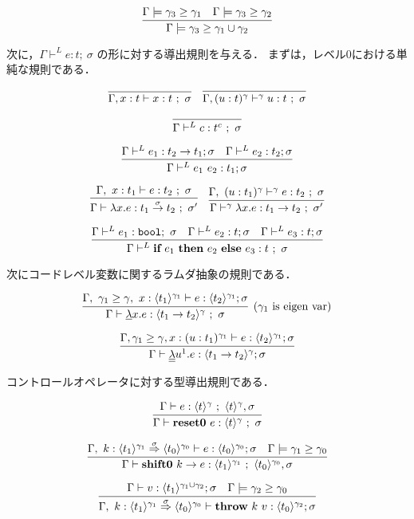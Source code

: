 \documentclass[T]{compsoft}
\newcommand\fun[2]{\lambda{#1}.{#2}}
\newcommand\Resetz{\textbf{reset0}}
\newcommand\Shiftz{\textbf{shift0}}
\newcommand\Throw{\textbf{throw}}
\newcommand\resetz[1]{\Resetz~{#1}}
\newcommand\shiftz[2]{\Shiftz~{#1}\to{#2}}
\newcommand\throw[2]{\Throw~{#1}~{#2}}
\newcommand\cfun[2]{\underline{\lambda}{#1}.{#2}}
\newcommand\ccfun[2]{\underline{\underline{\lambda}}{#1}.{#2}}
\newcommand\boolT{\mbox{\texttt{bool}}}
\newcommand\codeT[2]{\langle{#1}\rangle^{#2}}
\newcommand\funT[3]{{#1} \stackrel{#3}{\rightarrow} {#2}}
\newcommand\contT[3]{{#1} \stackrel{#3}{\Rightarrow} {#2}}
\newcommand\ord{\ge}
\newcommand\ift[3]{\textbf{if}~{#1}~\textbf{then}~{#2}~\textbf{else}~{#3}}
\theoremstyle{break}
\begin{document}
\[
  \infer
  {\Gamma \models \gamma_3 \ord \gamma_1 \cup \gamma_2}
  {\Gamma \models \gamma_3 \ord \gamma_1
    &\Gamma \models \gamma_3 \ord \gamma_2}
\]



次に，$\Gamma \vdash^{L} e : t ;~\sigma$ の形に対する導出規則を与える．
まずは，レベル0における単純な規則である．

\[
  \infer
  {\Gamma, x : t \vdash x : t ~;~ \sigma}
  {}
  \quad
  \infer
  {\Gamma, (u : t)^\gamma \vdash^\gamma u : t ~;~ \sigma}
  {}
\]

\[
  \infer
  {\Gamma \vdash^{L} c : t^c ~;~\sigma}
  {}
\]

\[
  \infer
  {\Gamma \vdash^{L} e_1~ e_2 : t_1 ; \sigma}
  {\Gamma \vdash^{L} e_1 : t_2 \to t_1 ; \sigma
    & \Gamma \vdash^{L} e_2 : t_2  ; \sigma
  }
\]

\[
  \infer
  {\Gamma \vdash \fun{x}{e} : \funT{t_1}{t_2}{\sigma} ~;~\sigma'}
  {\Gamma,~x : t_1 \vdash e : t_2 ~;~ \sigma}
  \quad
  \infer
  {\Gamma \vdash^\gamma \fun{x}{e} : \funT{t_1}{t_2}{} ~;~\sigma'}
  {\Gamma,~(u : t_1)^\gamma \vdash^\gamma e : t_2 ~;~ \sigma}
\]

\[
  \infer
  {\Gamma \vdash^{L} \ift{e_1}{e_2}{e_3} : t ~;~ \sigma}
  {\Gamma \vdash^{L} e_1 : \boolT ;~ \sigma
    & \Gamma \vdash^{L} e_2 : t ; \sigma
    & \Gamma \vdash^{L} e_3 : t ; \sigma}
\]

次にコードレベル変数に関するラムダ抽象の規則である．

\[
  \infer[(\gamma_1~\text{is eigen var})]
  {\Gamma \vdash \cfun{x}{e} : \codeT{t_1\to t_2}{\gamma} ~;~ \sigma}
  {\Gamma,~\gamma_1 \ord \gamma,~x:\codeT{t_1}{\gamma_1} \vdash e
    : \codeT{t_2}{\gamma_1}; \sigma}
\]

\[
  \infer
  {\Gamma \vdash \ccfun{u^1}{e} : \codeT{t_1 \to t_2}{\gamma} ; \sigma}
  {\Gamma, \gamma_1 \ord \gamma, x : (u : t_1)^{\gamma_1} \vdash e : \codeT{t_2}{\gamma_1} ; \sigma}
\]

コントロールオペレータに対する型導出規則である．

\[
  \infer{\Gamma \vdash \resetz{e} : \codeT{t}{\gamma} ~;~ \sigma}
  {\Gamma \vdash e : \codeT{t}{\gamma} ~;~ \codeT{t}{\gamma}, \sigma}
\]

\[
  \infer{\Gamma \vdash \shiftz{k}{e} : \codeT{t_1}{\gamma_1} ~;~ \codeT{t_0}{\gamma_0},\sigma}
  {\Gamma,~k:\contT{\codeT{t_1}{\gamma_1}}{\codeT{t_0}{\gamma_0}}{\sigma}
    \vdash e : \codeT{t_0}{\gamma_0} ; \sigma
    & \Gamma \models \gamma_1 \ord \gamma_0
  }
\]

\[
  \infer
  {\Gamma,~k:\contT{\codeT{t_1}{\gamma_1}}{\codeT{t_0}{\gamma_0}}{\sigma}
    \vdash \throw{k}{v} : \codeT{t_0}{\gamma_2} ; \sigma}
  {\Gamma
    \vdash v : \codeT{t_1}{\gamma_1 \cup \gamma_2} ; \sigma
    & \Gamma \models \gamma_2 \ord \gamma_0
  }
\]
\end{document}
